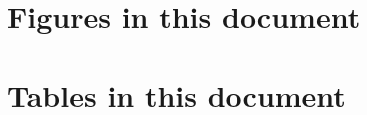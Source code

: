 \pagebreak
\section{Figures in this document}
\par \vspace{0.5cm}

\listoffigures

\section{Tables in this document}

\listoftables

\par \vspace{0.5cm}